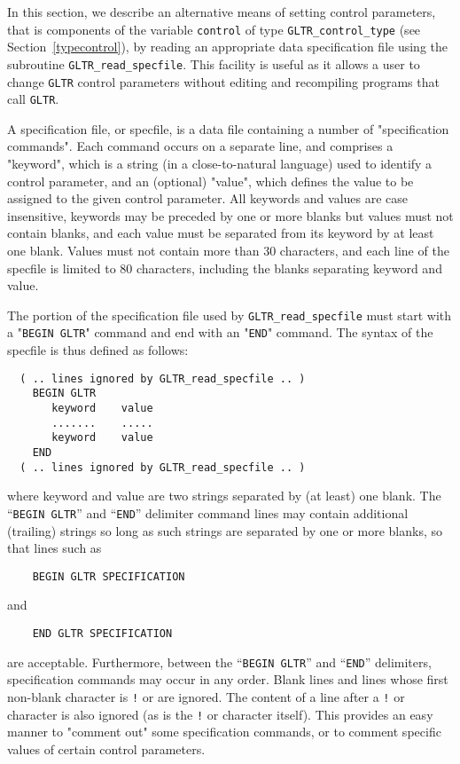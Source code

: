 \documentclass{galahad}
\newcommand{\packagename}{GL\-TR}
\begin{document}

\galfeatures
\noindent In this section, we describe an alternative means of setting
control parameters, that is components of the variable {\tt control} of type
{\tt \packagename\_control\_type}
(see Section~\ref{typecontrol}),
by reading an appropriate data specification file using the
subroutine {\tt \packagename\_read\_specfile}. This facility
is useful as it allows a user to change  {\tt \packagename} control parameters
without editing and recompiling programs that call {\tt \packagename}.

A specification file, or specfile, is a data file containing a number of
"specification commands". Each command occurs on a separate line,
and comprises a "keyword",
which is a string (in a close-to-natural language) used to identify a
control parameter, and
an (optional) "value", which defines the value to be assigned to the given
control parameter. All keywords and values are case insensitive,
keywords may be preceded by one or more blanks but
values must not contain blanks, and
each value must be separated from its keyword by at least one blank.
Values must not contain more than 30 characters, and
each line of the specfile is limited to 80 characters,
including the blanks separating keyword and value.

The portion of the specification file used by
{\tt \packagename\_read\_specfile}
must start
with a "{\tt BEGIN \packagename}" command and end with an
"{\tt END}" command.  The syntax of the specfile is thus defined as follows:
\begin{verbatim}
  ( .. lines ignored by GLTR_read_specfile .. )
    BEGIN GLTR
       keyword    value
       .......    .....
       keyword    value
    END
  ( .. lines ignored by GLTR_read_specfile .. )
\end{verbatim}
where keyword and value are two strings separated by (at least) one blank.
The ``{\tt BEGIN \packagename}'' and ``{\tt END}'' delimiter command lines
may contain additional (trailing) strings so long as such strings are
separated by one or more blanks, so that lines such as
\begin{verbatim}
    BEGIN GLTR SPECIFICATION
\end{verbatim}
and
\begin{verbatim}
    END GLTR SPECIFICATION
\end{verbatim}
are acceptable. Furthermore,
between the
``{\tt BEGIN \packagename}'' and ``{\tt END}'' delimiters,
specification commands may occur in any order.  Blank lines and
lines whose first non-blank character is {\tt !} or {\tt *} are ignored.
The content
of a line after a {\tt !} or {\tt *} character is also
ignored (as is the {\tt !} or {\tt *}
character itself). This provides an easy manner to "comment out" some
specification commands, or to comment specific values
of certain control parameters.
\end{document}
